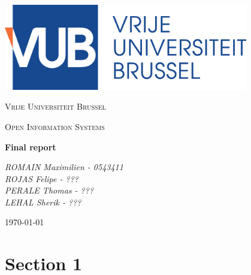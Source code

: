 \documentclass[a4paper,12pt]{article}
\begin{document}
\begin{titlepage}
	\centering
	\includegraphics[width=0.8\textwidth]{logo.eps}\par\vspace{1cm}
	{\scshape\LARGE Vrije Universiteit Brussel\par}
	\vspace{1cm}
	{\scshape\Large Open Information Systems\par}
	\vspace{1.5cm}
	{\huge\bfseries Final report\par}
	\vspace{2cm}
	{\Large\itshape ROMAIN Maximilien - 0543411\\ ROJAS Felipe - ???\\PERALE Thomas - ???\\ LEHAL Sherik - ???\par}
	\vfill

	{\large \today\par}
\end{titlepage}

\newpage

\section{Section 1}
\end{document}
